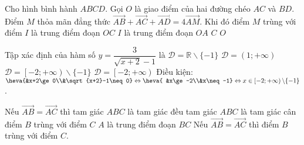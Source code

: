 \begin{ex}%
Cho hình bình hành $ABCD$. Gọi $O$ là giao điểm của hai đường chéo $AC$ và $BD$. Điểm $M$ thỏa mãn đẳng thức $\overrightarrow{AB} + \overrightarrow{AC} + \overrightarrow{AD} = 4\overrightarrow{AM}$. Khi đó điểm $M$ trùng với điểm
\choice
{$I$ là trung điểm đoạn $OC$}
{$I$ là trung điểm đoạn $OA$}
{$C$}
{\True $O$}
\loigiai
{
}
\end{ex}

\begin{ex}%
Tập xác định của hàm số $y = \dfrac{3}{\sqrt{x+2}-1}$ là 
\choice
{$\mathscr{D} = \mathbb{R}\backslash\{-1\}$}
{$\mathscr{D} = \left(1;+\infty\right)$}
{\True $\mathscr{D} = \left[-2;+\infty\right)\backslash\{-1\}$}
{$\mathscr{D} = \left[-2;+\infty\right)$}
\loigiai
{
Điều kiện: $\heva{&x+2\ge 0\\&\sqrt{x+2}-1\neq 0} \Leftrightarrow\heva{ &x\ge -2\\&x\neq -1} \Leftrightarrow x\in \left[-2;+\infty\right)\backslash\{-1\}$.
}
\end{ex}

\begin{ex}%
Nếu $\overrightarrow{AB} = \overrightarrow{AC}$ thì 
\choice
{tam giác $ABC$ là tam giác đều}
{tam giác $ABC$ là tam giác cân}
{\True điểm $B$ trùng với điểm $C$}
{$A$ là trung điểm đoạn $BC$}
\loigiai
{
Nếu $\overrightarrow{AB} = \overrightarrow{AC}$ thì điểm $B$ trùng với điểm $C$.
}
\end{ex}

